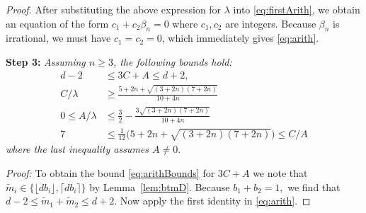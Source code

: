 \documentclass[11pt, reqno]{amsart}
\theoremstyle{remark}
\numberwithin{equation}{subsection}
\numberwithin{figure}{section}
\theoremstyle{customremark}
\newcommand{\NI}{{\noindent}}
\newcommand{\be}{{\beta}}
\newcommand{\la}{{\lambda}}
\newcommand{\MS}{{\medskip}}
\begin{document}
\begin{proof}
After substituting the above expression for $\lambda$ into \eqref{eq:firstArith},
we obtain an equation of the form $c_1 + c_2\be_n = 0$ where $c_1, c_2$ are integers. Because  $\beta_n$ is irrational,
we must have  $c_1 = c_2=0$, which immediately gives 
\eqref{eq:arith}.
\MS\MS

\NI {\bf Step 3:} {\it  Assuming $n \geq 3$, the following bounds hold:}
\begin{align} \label{eq:arithBounds}
     d-2& \leq 3C+A \leq d+2,\\
\label{eq:ClaAlabound}
   C/\la &\geq      \frac{5+2n+\sqrt{(3+2n)(7+2n)}}{10+4n}  \\ \label{eq:Alabound}
        0 \leq A/\la &\leq \frac{3}{2}-\frac{3\sqrt{(3+2n)(7+2n)}}{10+4n}\\
        \label{eq:CoverA}
          7 &\leq  \tfrac{1}{12}\bigl(5+2n+\sqrt{(3+2n)(7+2n)}\bigr) \leq C/A
     \end{align} 
     {\it where the last inequality assumes $A \neq 0.$}
\MS

\NI {\it Proof:} To obtain the bound \eqref{eq:arithBounds} for
 $3C+A$ we note that  
$ \widetilde{m}_i \in \{\lfloor db_i \rfloor, \lceil db_i \rceil \}$ by Lemma~\ref{lem:btmD}.  
Because $b_1+b_2=1,$
we find that  $ d-2 \leq \widetilde{m}_1+\widetilde{m}_2 \leq d+2$. Now apply
the first identity in 
\eqref{eq:arith}.
\MS


\end{proof}
\end{document}
